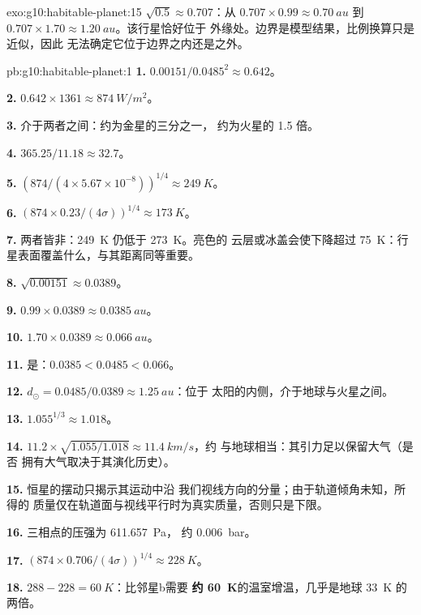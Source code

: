 \begin{solution}{exo:g10:habitable-planet:15}
$\sqrt{0.5} \approx 0.707$：从 $0.707 \times 0.99 \approx \qty{0.70}{au}$
到 $0.707 \times 1.70 \approx \qty{1.20}{au}$。该行星恰好位于
外缘处。边界是模型结果，比例换算只是近似，因此
无法确定它位于边界之内还是之外。
\end{solution}

\begin{solution}{pb:g10:habitable-planet:1}
\textbf{1.} $0.00151/0.0485^2 \approx 0.642$。

\textbf{2.} $0.642 \times 1361 \approx \qty{874}{W/m^2}$。

\textbf{3.} 介于两者之间：约为金星的三分之一，
约为火星的 1.5 倍。

\textbf{4.} $365.25/11.18 \approx 32.7$。

\textbf{5.} $(874/(4 \times 5.67\times10^{-8}))^{1/4} \approx \qty{249}{K}$。

\textbf{6.} $(874 \times 0.23/(4\sigma))^{1/4} \approx \qty{173}{K}$。

\textbf{7.} 两者皆非：\qty{249}{K} 仍低于 \qty{273}{K}。亮色的
云层或冰盖会使下降超过
\qty{75}{K}：行星表面覆盖什么，与其距离同等重要。

\textbf{8.} $\sqrt{0.00151} \approx 0.0389$。

\textbf{9.} $0.99 \times 0.0389 \approx \qty{0.0385}{au}$。

\textbf{10.} $1.70 \times 0.0389 \approx \qty{0.066}{au}$。

\textbf{11.} 是：$0.0385 < 0.0485 < 0.066$。

\textbf{12.} $d_\odot = 0.0485/0.0389 \approx \qty{1.25}{au}$：位于
太阳的内侧，介于地球与火星之间。

\textbf{13.} $1.055^{1/3} \approx 1.018$。

\textbf{14.} $11.2 \times \sqrt{1.055/1.018} \approx \qty{11.4}{km/s}$，约
与地球相当：其引力足以保留大气（是否
拥有大气取决于其演化历史）。

\textbf{15.} 恒星的摆动只揭示其运动中沿
我们视线方向的分量；由于轨道倾角未知，所得的
质量仅在轨道面与视线平行时为真实质量，否则只是下限。

\textbf{16.} 三相点的压强为 \qty{611.657}{Pa}，
约 \qty{0.006}{bar}。

\textbf{17.} $(874 \times 0.706/(4\sigma))^{1/4} \approx \qty{228}{K}$。

\textbf{18.} $288 - 228 = \qty{60}{K}$：比邻星b需要
\textbf{约 \qty{60}{K}}的温室增温，几乎是地球 \qty{33}{K} 的两倍。
\end{solution}
